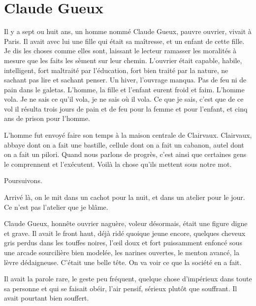 \documentclass[french,twoside]{book} %
\begin{document}
   \chapter[{Claude Gueux}]{Claude Gueux}
\noindent Il y a sept ou huit ans, un homme nommé Claude Gueux, pauvre ouvrier, vivait à Paris. Il avait avec lui une fille qui était sa maîtresse, et un enfant de cette fille. Je dis les choses comme elles sont, laissant le lecteur ramasser les moralités à mesure que les faits les sèment sur leur chemin. L’ouvrier était capable, habile, intelligent, fort maltraité par l’éducation, fort bien traité par la nature, ne sachant pas lire et sachant penser. Un hiver, l’ouvrage manqua. Pas de feu ni de pain dans le galetas. L’homme, la fille et l’enfant eurent froid et faim. L’homme vola. Je ne sais ce qu’il vola, je ne sais où il vola. Ce que je sais, c’est que de ce vol il résulta trois jours de pain et de feu pour la femme et pour l’enfant, et cinq ans de prison pour l’homme.\par
L’homme fut envoyé faire son temps à la maison centrale de Clairvaux. Clairvaux, abbaye dont on a fait une bastille, cellule dont on a fait un cabanon,  autel dont on a fait un pilori. Quand nous parlons de progrès, c’est ainsi que certaines gens le comprennent et l’exécutent. Voilà la chose qu’ils mettent sous notre mot.\par
Poursuivons.\par
Arrivé là, on le mit dans un cachot pour la nuit, et dans un atelier pour le jour. Ce n’est pas l’atelier que je blâme.\par
Claude Gueux, honnête ouvrier naguère, voleur désormais, était une figure digne et grave. Il avait le front haut, déjà ridé quoique jeune encore, quelques cheveux gris perdus dans les touffes noires, l’œil doux et fort puissamment enfoncé sous une arcade sourcilière bien modelée, les narines ouvertes, le menton avancé, la lèvre dédaigneuse. C’était une belle tête. On va voir ce que la société en a fait.\par
Il avait la parole rare, le geste peu fréquent, quelque chose d’impérieux dans toute sa personne et qui se faisait obéir, l’air pensif, sérieux plutôt que souffrant. Il avait pourtant bien souffert.\par
\end{document}
